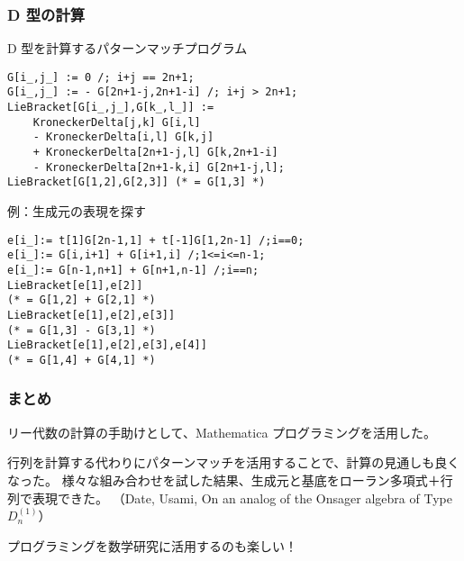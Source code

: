 \documentclass{beamer}
\begin{document}
\begin{frame}[fragile]
    \frametitle{D 型の計算}

    \begin{exampleblock}{D 型を計算するパターンマッチプログラム}
        \begin{lstlisting}
G[i_,j_] := 0 /; i+j == 2n+1;
G[i_,j_] := - G[2n+1-j,2n+1-i] /; i+j > 2n+1;
LieBracket[G[i_,j_],G[k_,l_]] :=
    KroneckerDelta[j,k] G[i,l]
    - KroneckerDelta[i,l] G[k,j]
    + KroneckerDelta[2n+1-j,l] G[k,2n+1-i]
    - KroneckerDelta[2n+1-k,i] G[2n+1-j,l];
LieBracket[G[1,2],G[2,3]] (* = G[1,3] *)
        \end{lstlisting}
    \end{exampleblock}
\end{frame}

\begin{frame}[fragile]
    \begin{exampleblock}{例：生成元の表現を探す}
        \begin{lstlisting}
e[i_]:= t[1]G[2n-1,1] + t[-1]G[1,2n-1] /;i==0;
e[i_]:= G[i,i+1] + G[i+1,i] /;1<=i<=n-1;
e[i_]:= G[n-1,n+1] + G[n+1,n-1] /;i==n;
LieBracket[e[1],e[2]]
(* = G[1,2] + G[2,1] *)
LieBracket[e[1],e[2],e[3]]
(* = G[1,3] - G[3,1] *)
LieBracket[e[1],e[2],e[3],e[4]]
(* = G[1,4] + G[4,1] *)
        \end{lstlisting}
    \end{exampleblock}
\end{frame}

\begin{frame}
    \frametitle{まとめ}

    リー代数の計算の手助けとして、Mathematica プログラミングを活用した。

    行列を計算する代わりにパターンマッチを活用することで、計算の見通しも良くなった。
    様々な組み合わせを試した結果、生成元と基底をローラン多項式＋行列で表現できた。
    （Date, Usami, On an analog of the Onsager algebra of Type \(D_n^{(1)}\)）

    \bigskip

    プログラミングを数学研究に活用するのも楽しい！
\end{frame}
\end{document}

